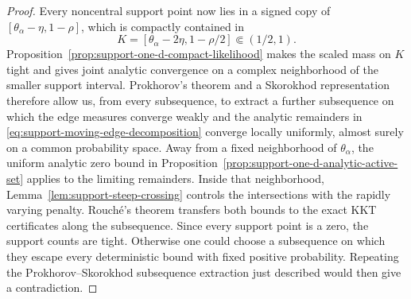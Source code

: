 \begin{proof}
Every noncentral support point now lies in a signed copy of
\([\theta_\alpha-\eta,1-\rho]\), which is compactly contained in
\[
    K=[\theta_\alpha-2\eta,1-\rho/2]\Subset(1/2,1).
\]
Proposition~\ref{prop:support-one-d-compact-likelihood} makes the scaled mass
on \(K\) tight and gives joint analytic convergence on a complex neighborhood
of the smaller support interval.
Prokhorov's theorem and a Skorokhod representation therefore allow us, from
every subsequence, to extract a further subsequence on which the edge measures
converge weakly and the analytic remainders in
\eqref{eq:support-moving-edge-decomposition} converge locally uniformly,
almost surely on a common probability space.
Away from a fixed neighborhood of \(\theta_\alpha\), the uniform analytic
zero bound in Proposition~\ref{prop:support-one-d-analytic-active-set} applies
to the limiting remainders. Inside that neighborhood,
Lemma~\ref{lem:support-steep-crossing} controls the intersections with the
rapidly varying penalty. Rouch\'e's theorem transfers both bounds to the exact
KKT certificates along the subsequence. Since every support point is a zero,
the support counts are tight. Otherwise one could choose a subsequence
on which they escape every deterministic bound with fixed positive
probability. Repeating the Prokhorov--Skorokhod subsequence extraction just
described would then give a contradiction.

\end{proof}
